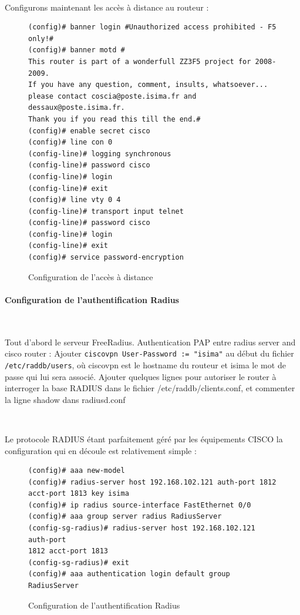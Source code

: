 ~

Configurons maintenant les accès à distance au routeur :
\begin{figure}[H]
	\begin{center}
		\begin{minipage}{0.95\textwidth}
			\begin{lstlisting}[frame=trBL]
(config)# banner login #Unauthorized access prohibited - F5 only!#
(config)# banner motd #
This router is part of a wonderfull ZZ3F5 project for 2008-2009.
If you have any question, comment, insults, whatsoever...
please contact coscia@poste.isima.fr and dessaux@poste.isima.fr.
Thank you if you read this till the end.#
(config)# enable secret cisco
(config)# line con 0
(config-line)# logging synchronous
(config-line)# password cisco
(config-line)# login
(config-line)# exit
(config)# line vty 0 4
(config-line)# transport input telnet
(config-line)# password cisco
(config-line)# login
(config-line)# exit
(config)# service password-encryption
			\end{lstlisting}
		\end{minipage}
	\end{center}
	\caption{Configuration de l'accès à distance}
	\label{configuration_acces_a_distance}
\end{figure}

\paragraph{Configuration de l'authentification Radius}
~

Tout d'abord le serveur FreeRadius.
Authentication PAP entre radius server and cisco router :
Ajouter \verb|ciscovpn User-Password := "isima"|  au début du fichier \verb|/etc/raddb/users|, où ciscovpn est le hostname du routeur et isima le mot de passe qui lui sera associé.
Ajouter quelques lignes pour autoriser le router à interroger la base RADIUS dans le fichier /etc/raddb/clients.conf, et commenter la ligne shadow dans radiusd.conf

~

Le protocole RADIUS étant parfaitement géré par les équipements CISCO la configuration qui en découle est relativement simple :

\begin{figure}[H]
	\begin{center}
		\begin{minipage}{0.90\textwidth}
			\begin{lstlisting}[frame=trBL]
(config)# aaa new-model
(config)# radius-server host 192.168.102.121 auth-port 1812
acct-port 1813 key isima
(config)# ip radius source-interface FastEthernet 0/0
(config)# aaa group server radius RadiusServer
(config-sg-radius)# radius-server host 192.168.102.121 auth-port
1812 acct-port 1813
(config-sg-radius)# exit
(config)# aaa authentication login default group RadiusServer
			\end{lstlisting}
		\end{minipage}
	\end{center}
	\caption{Configuration de l'authentification Radius}
	\label{configuration_authentification_radius}
\end{figure}


